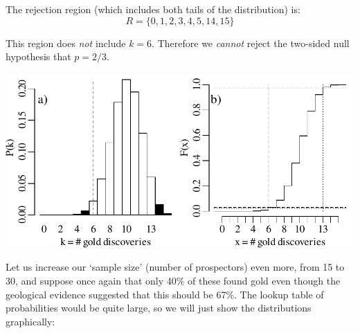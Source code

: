 The rejection region (which includes both tails of the distribution)
is:
\begin{equation}
  R=\{0,1,2,3,4,5,14,15\}
  \label{eq:2sidedbinomtest15}
\end{equation}

This region does \emph{not} include $k=6$. Therefore we \emph{cannot}
reject the two-sided null hypothesis that $p=2/3$.\medskip

\noindent\begin{minipage}[t][][b]{.6\textwidth}
\includegraphics[width=\textwidth]{../figures/2sidedbinomialrejection15.pdf}
\medskip
\end{minipage}
\begin{minipage}[t][][t]{.4\textwidth}
  \label{fig:2sidedbinomialrejection15}
\end{minipage}

Let us increase our `sample size' (number of prospectors) even more,
from 15 to 30, and suppose once again that only 40\% of these found
gold even though the geological evidence suggested that this should be
67\%. The lookup table of probabilities would be quite large, so we
will just show the distributions graphically:\medskip

